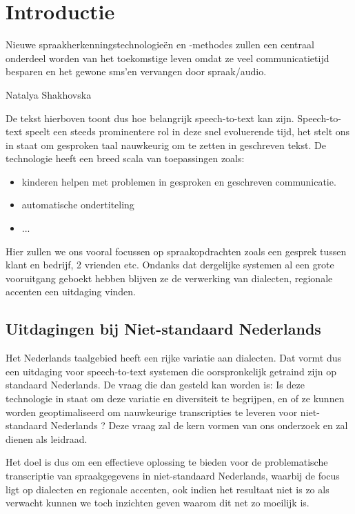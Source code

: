 

\section{Introductie}%
\label{sec:introductie}
\epigraph{Nieuwe spraakherkenningstechnologieën en -methodes zullen een centraal onderdeel worden van 
    het toekomstige leven omdat ze veel communicatietijd besparen en het gewone sms'en 
    vervangen door spraak/audio.}{Natalya Shakhovska}
    
De tekst hierboven toont dus hoe belangrijk speech-to-text kan zijn. 
Speech-to-text speelt een steeds prominentere rol in deze snel evoluerende tijd, het stelt ons in staat om gesproken taal nauwkeurig om te zetten in geschreven tekst. De technologie heeft een breed scala van toepassingen zoals:
\begin{itemize}
    \item kinderen helpen met problemen in gesproken en geschreven communicatie.\autocite{Kambouri2023}
    \item automatische ondertiteling
    \item ...
\end{itemize}

Hier zullen we ons vooral focussen op spraakopdrachten zoals een gesprek tussen klant en bedrijf, 2 vrienden etc.
Ondanks dat dergelijke systemen al een grote vooruitgang geboekt hebben blijven ze de verwerking van dialecten, regionale accenten een uitdaging vinden.

\subsection{Uitdagingen bij Niet-standaard Nederlands}
Het Nederlands taalgebied heeft een rijke variatie aan dialecten. Dat vormt dus een uitdaging voor speech-to-text systemen die oorspronkelijk getraind zijn op standaard Nederlands. De vraag die dan gesteld kan worden is: Is deze technologie in staat om deze variatie en diversiteit te begrijpen, en of ze kunnen worden geoptimaliseerd om nauwkeurige transcripties te leveren voor niet-standaard Nederlands ?
Deze vraag zal de kern vormen van ons onderzoek en zal dienen als leidraad.

Het doel is dus om een effectieve oplossing te bieden voor de problematische transcriptie van spraakgegevens in niet-standaard Nederlands, waarbij de focus ligt op dialecten en regionale accenten, ook indien het resultaat niet is zo als verwacht kunnen we toch inzichten geven waarom dit net zo moeilijk is. 

